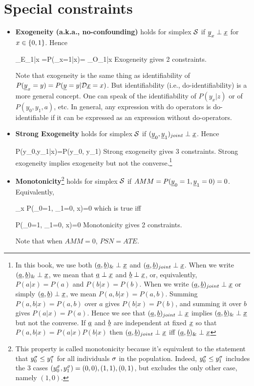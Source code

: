 \section{Special constraints}
\begin{itemize}
\item
{\bf Exogeneity (a.k.a., no-confounding)}
holds for simplex ${\cal S}$
if
${\underline{y}}_x\perp {\underline{x}}$ for $x\in\{0,1\}$.
 Hence

\beq
{}_{E_{1|x}}
=P(\rvy_x=1|x)=
_{O_{1|x}}
\quad {}
\eeq
Exogeneity gives {\color{red}2 constraints}.

Note that exogeneity
is the same thing as identifiability 
of $P({\underline{y}}_x=y)=P({\underline{y}}=y|{\cal D}{\underline{x}}=x)$.
But identifiability
(i.e., do-identifiability) is a more 
general concept. One can speak
of the identifiability of $P(y_x|z)$
or of $P(y_0, y_1, a)$, etc.
In general,
any expression with 
do operators is do-identifiable
if it can be expressed 
as an expression without 
do-operators.

\item
{\bf Strong Exogeneity} holds 
for simplex ${\cal S}$
if $({\underline{y}}_0, {\underline{y}}_1)_{joint}
\perp {\underline{x}}$. Hence

\beq
P(y_0,y_1|x)=P(y_0, y_1)
\label{eq-strong-exogen}
\eeq
Strong exogeneity gives {\color{red} 3 constraints}.
Strong exogeneity implies
exogeneity
but not the converse.\footnote{In
this book, we use both 
$({\underline{a}}, {\underline{b}})_\&\perp {\underline{x}}$
and $({\underline{a}}, {\underline{b}})_{joint}\perp {\underline{x}}$.
When we write $({\underline{a}}, {\underline{b}})_\&\perp {\underline{x}}$,
we mean that
${\underline{a}}\perp {\underline{x}}$
and ${\underline{b}}\perp{\underline{x}}$,
or, equivalently,
$P(a|x)=P(a)$
and $P(b|x)=P(b)$.
When we write
$({\underline{a}}, {\underline{b}})_{joint}\perp {\underline{x}}$
or simply $({\underline{a}}, {\underline{b}})\perp {\underline{x}}$,
we mean $P(a,b|x)=P(a,b)$.
Summing
$P(a,b|x)=P(a,b)$
over $a$ gives
$P(b|x)=P(b)$,
and summing it
over $b$ gives 
$P(a|x)=P(a)$.
Hence we see that
 $({\underline{a}}, {\underline{b}})_{joint}\perp {\underline{x}}$
implies
$({\underline{a}}, {\underline{b}})_\&\perp {\underline{x}}$
but not the converse.
If ${\underline{a}}$ and ${\underline{b}}$ are independent at
fixed ${\underline{x}}$ so that 
$P(a,b|x)=P(a|x)P(b|x)$ then
$({\underline{a}}, {\underline{b}})_{joint}\perp {\underline{x}}$
iff
$({\underline{a}}, {\underline{b}})_\&\perp {\underline{x}}$
}
\item
{\bf Monotonicity}\footnote{
This property is called monotonicity
 because
it's equivalent to the statement
that $y_0^\sigma\leq y_1^\sigma$ for 
all individuals $\sigma$
in the population.
Indeed, $y_0^\sigma\leq y_1^\sigma$
includes the 3 cases $(y_0^\sigma, y_1^\sigma)=
(0,0), (1, 1), (0,1)$, but
excludes the only other
case, namely $(1,0)$.}
 holds for simplex ${\cal S}$ if $AMM=P({\underline{y}}_0=1,
 {\underline{y}}_1=0)=0$. Equivalently,

\beq
\sum_x P(\rvy_0=1, \rvy_1=0, x)=0
\eeq
which is true iff

\beq
 P(\rvy_0=1, \rvy_1=0, x)=0\quad
{}
\eeq
Monotonicity gives {\color{red} 2 
constraints}.

Note that when $AMM=0$, $PSN=ATE$.
\end{itemize}



